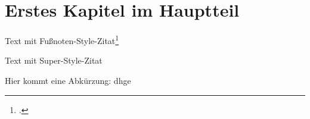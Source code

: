 \section{Erstes Kapitel im Hauptteil}
Text mit Fußnoten-Style-Zitat\footcite{Xarticle}

Text mit Super-Style-Zitat\supercite{Xarticle}

Hier kommt eine Abkürzung: \ac{dhge}